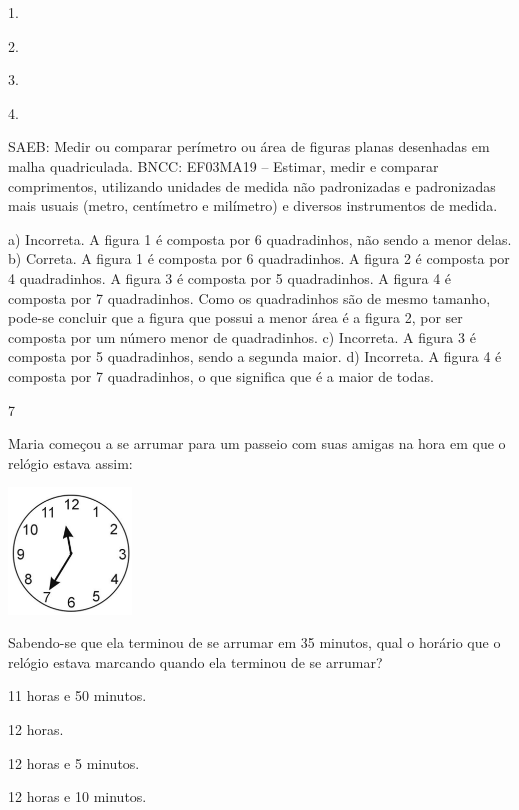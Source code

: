 \begin{multicols}{2}
\begin{enumerate}
{\begin{escolha}
\item
  1.
\item
  2.
\item
  3.
\item
  4.
\end{escolha}

SAEB: Medir ou comparar perímetro ou área de figuras planas desenhadas em malha quadriculada.
BNCC: EF03MA19 -- Estimar, medir e comparar comprimentos, utilizando unidades de medida
não padronizadas e padronizadas mais usuais (metro, centímetro e milímetro) e diversos
instrumentos de medida.

a) Incorreta. A figura 1 é composta por 6 quadradinhos, não sendo a menor delas.
b) Correta. A figura 1 é composta por 6 quadradinhos. A figura 2 é composta por 4 quadradinhos. A figura 3 é composta por 5 quadradinhos. A figura 4 é composta por 7 quadradinhos. Como os quadradinhos são de mesmo tamanho, pode-se concluir que a figura que possui a menor área é a figura 2, por ser composta por um número menor de quadradinhos.
c) Incorreta. A figura 3 é composta por 5 quadradinhos, sendo a segunda maior.
d) Incorreta. A figura 4 é composta por 7 quadradinhos, o que significa que é a maior de todas.

\num{7}

Maria começou a se arrumar para um passeio com suas amigas na hora em que o relógio estava assim:


\includegraphics[width=1.29487in,height=1.32633in]{media/image134.png}

Sabendo-se que ela terminou de se arrumar em 35 minutos, qual o horário que o relógio estava marcando quando ela terminou de se arrumar?

\begin{escolha}

\item
  11 horas e 50 minutos.
\item
  12 horas.
\item
  12 horas e 5 minutos.
\item
  12 horas e 10 minutos.
\end{escolha}

}
\end{enumerate}
\end{multicols}
